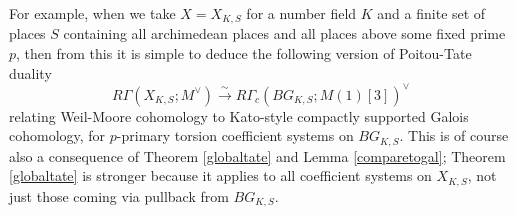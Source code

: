 \documentclass[12pt]{article}
\theoremstyle{definition}
\begin{document}
For example, when we take $X=X_{K,S}$ for a number field $K$ and a finite set of places $S$ containing all archimedean places and all places above some fixed prime $p$, then from this it is simple to deduce the following version of Poitou-Tate duality
$$R\Gamma(X_{K,S};M^\vee)\overset{\sim}{\rightarrow} R\Gamma_c(BG_{K,S};M(1)[3])^\vee$$
relating Weil-Moore cohomology to Kato-style compactly supported Galois cohomology, for $p$-primary torsion coefficient systems on $BG_{K,S}$.  This is of course also a consequence of Theorem \ref{globaltate} and Lemma \ref{comparetogal}; Theorem \ref{globaltate} is stronger because it applies to all coefficient systems on $X_{K,S}$, not just those coming via pullback from $BG_{K,S}$.

\printbibliography
\end{document}
